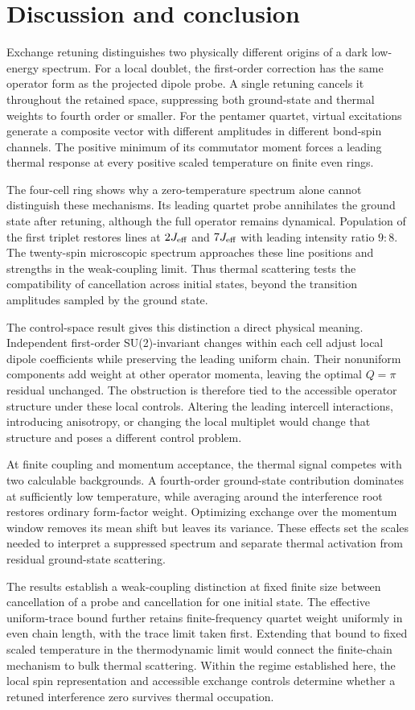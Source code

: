 \section{Discussion and conclusion}

Exchange retuning distinguishes two physically different origins of a
dark low-energy spectrum. For a local doublet, the first-order correction
has the same operator form as the projected dipole probe.
A single retuning cancels it throughout the retained space, suppressing
both ground-state and thermal weights to fourth order or smaller.
For the pentamer quartet, virtual excitations generate a composite vector
with different amplitudes in different bond-spin channels.
The positive minimum of its commutator moment forces a leading thermal
response at every positive scaled temperature on finite even rings.

The four-cell ring shows why a zero-temperature spectrum alone cannot
distinguish these mechanisms. Its leading quartet probe annihilates the
ground state after retuning, although the full operator remains dynamical.
Population of the first triplet restores lines at $2J_{\rm eff}$ and
$7J_{\rm eff}$ with leading intensity ratio $9:8$.
The twenty-spin microscopic spectrum approaches these line positions
and strengths in the weak-coupling limit.
Thus thermal scattering tests the compatibility of cancellation across
initial states, beyond the transition amplitudes sampled by the ground state.

The control-space result gives this distinction a direct physical meaning.
Independent first-order SU(2)-invariant changes within each cell adjust
local dipole coefficients while preserving the leading uniform chain.
Their nonuniform components add weight at other operator momenta, leaving
the optimal $Q=\pi$ residual unchanged.
The obstruction is therefore tied to the accessible operator structure
under these local controls. Altering the leading intercell interactions,
introducing anisotropy, or changing the local multiplet would change
that structure and poses a different control problem.

At finite coupling and momentum acceptance, the thermal signal competes
with two calculable backgrounds. A fourth-order ground-state contribution
dominates at sufficiently low temperature, while averaging around the
interference root restores ordinary form-factor weight.
Optimizing exchange over the momentum window removes its mean shift but
leaves its variance. These effects set the scales needed to interpret
a suppressed spectrum and separate thermal activation from residual
ground-state scattering.

The results establish a weak-coupling distinction at fixed finite size
between cancellation of a probe and cancellation for one initial state.
The effective uniform-trace bound further retains finite-frequency
quartet weight uniformly in even chain length, with the trace limit
taken first. Extending that bound to fixed scaled temperature in the
thermodynamic limit would connect the finite-chain mechanism to bulk
thermal scattering. Within the regime established here, the local
spin representation and accessible exchange controls determine whether
a retuned interference zero survives thermal occupation.
